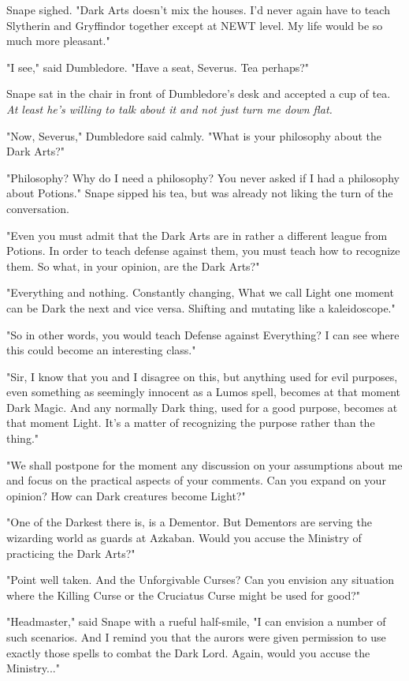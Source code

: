 \documentclass[a4paper,11pt]{article}
\begin{document}
Snape sighed. "Dark Arts doesn't mix the houses. I'd never again have to teach Slytherin and Gryffindor together except at NEWT level. My life would be so much more pleasant."

"I see," said Dumbledore. "Have a seat, Severus. Tea perhaps?"

Snape sat in the chair in front of Dumbledore's desk and accepted a cup of tea. \emph{At least he's willing to talk about it and not just turn me down flat.}

"Now, Severus," Dumbledore said calmly. "What is your philosophy about the Dark Arts?"

"Philosophy? Why do I need a philosophy? You never asked if I had a philosophy about Potions." Snape sipped his tea, but was already not liking the turn of the conversation.

"Even you must admit that the Dark Arts are in rather a different league from Potions. In order to teach defense against them, you must teach how to recognize them. So what, in your opinion, are the Dark Arts?"

"Everything and nothing. Constantly changing, What we call Light one moment can be Dark the next and vice versa. Shifting and mutating like a kaleidoscope."

"So in other words, you would teach Defense against Everything? I can see where this could become an interesting class."

"Sir, I know that you and I disagree on this, but anything used for evil purposes, even something as seemingly innocent as a Lumos spell, becomes at that moment Dark Magic. And any normally Dark thing, used for a good purpose, becomes at that moment Light. It's a matter of recognizing the purpose rather than the thing."

"We shall postpone for the moment any discussion on your assumptions about me and focus on the practical aspects of your comments. Can you expand on your opinion? How can Dark creatures become Light?"

"One of the Darkest there is, is a Dementor. But Dementors are serving the wizarding world as guards at Azkaban. Would you accuse the Ministry of practicing the Dark Arts?"

"Point well taken. And the Unforgivable Curses? Can you envision any situation where the Killing Curse or the Cruciatus Curse might be used for good?"

"Headmaster," said Snape with a rueful half-smile, "I can envision a number of such scenarios. And I remind you that the aurors were given permission to use exactly those spells to combat the Dark Lord. Again, would you accuse the Ministry..."
\end{document}
